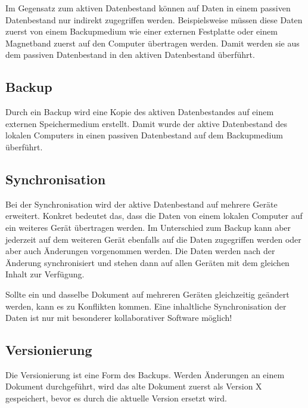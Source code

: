 Im Gegensatz zum aktiven Datenbestand können auf Daten in einem passiven
Datenbestand nur indirekt zugegriffen werden. Beispielsweise müssen diese
Daten zuerst von einem Backupmedium wie einer externen Festplatte oder einem
Magnetband zuerst auf den Computer übertragen werden. Damit werden sie aus
dem passiven Datenbestand in den aktiven Datenbestand überführt.

\subsection{Backup}

Durch ein Backup wird eine Kopie des aktiven Datenbestandes auf einem externen
Speichermedium erstellt. Damit wurde der aktive Datenbestand des lokalen
Computers in einen passiven Datenbestand auf dem Backupmedium überführt.

\subsection{Synchronisation}

Bei der Synchronisation wird der aktive Datenbestand auf mehrere Geräte
erweitert. Konkret bedeutet das, dass die Daten von einem lokalen Computer auf
ein weiteres Gerät übertragen werden. Im Unterschied zum Backup kann aber
jederzeit auf dem weiteren Gerät ebenfalls auf die Daten zugegriffen werden
oder aber auch Änderungen vorgenommen werden. Die Daten werden nach der Änderung
synchronisiert und stehen dann auf allen Geräten mit dem gleichen Inhalt zur
Verfügung.
\bigskip

 Sollte ein und dasselbe Dokument auf mehreren Geräten
gleichzeitig geändert werden, kann es zu Konflikten kommen. Eine inhaltliche
Synchronisation der Daten ist nur mit besonderer kollaborativer Software
möglich!

\subsection{Versionierung}

Die Versionierung ist eine Form des Backups. Werden Änderungen an einem Dokument
durchgeführt, wird das alte Dokument zuerst als Version X gespeichert, bevor es
durch die aktuelle Version ersetzt wird.
